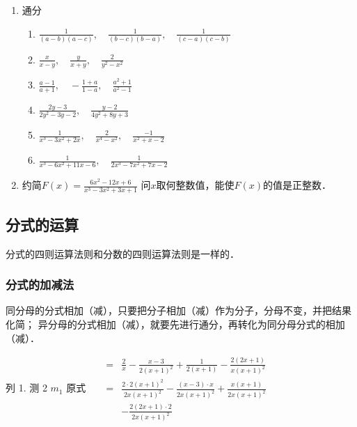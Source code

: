 \begin{ex}
\begin{enumerate}
\item  通分
\begin{enumerate}
\item  $\frac{1}{(a-b)(a-c)},\quad  \frac{1}{(b-c)(b-a)}, \quad \frac{1}{(c-a)(c-b)}$
\item $\frac{x}{x-y},\quad  \frac{y}{x+y}, \quad \frac{2}{y^{2}-x^{2}}$
\item  $\frac{a-1}{a+1},\quad -\frac{1+a}{1-a}, \quad \frac{a^{2}+1}{a^{2}-1}$
\item  $\frac{2 y-3}{2 y^{2}-3 y-2}, \quad \frac{y-2}{4 y^{2}+8 y+3}$
\item  $\frac{1}{x^{3}-3 x^{2}+2 x}, \quad \frac{2}{x^{4}-x^{2}}, \quad \frac{-1}{x^{2}+x-2}$
\item  $\frac{1}{x^{3}-6 x^{2}+11 x-6}, \quad \frac{1}{2 x^{3}-7 x^{2}+7 x-2}$
\end{enumerate}

\item 约简$F(x)=\frac{6x^2-12x+6}{x^3-3x^2+3x+1}$ 问$x$取何整数值，能使$F(x)$的值是正整数．
\end{enumerate}
\end{ex}

\subsection{分式的运算}
分式的四则运算法则和分数的四则运算法则是一样的．

\subsubsection{分式的加减法}

同分母的分式相加（减），只要把分子相加（减）作为分子，分母不变，并把结果化简；
异分母的分式相加（减），就要先进行通分，再转化为同分母分式的相加（减）．

列 1. 
测 2 
$m_{1}$ 原式 $\quad$ $\begin{aligned}=& \frac{2}{x}-\frac{x-3}{2(x+1)^{2}}+\frac{1}{2(x+1)}-\frac{2(2 x+1)}{x(x+1)^{2}} \\=& \frac{2 \cdot 2(x+1)^{2}}{2 x(x+1)^{2}}-\frac{(x-3) \cdot x}{2 x(x+1)^{2}}+\frac{x(x+1)}{2 x(x+1)^{2}} \\ &-\frac{2(2 x+1) \cdot 2}{2 x(x+1)^{2}} \end{aligned}$


